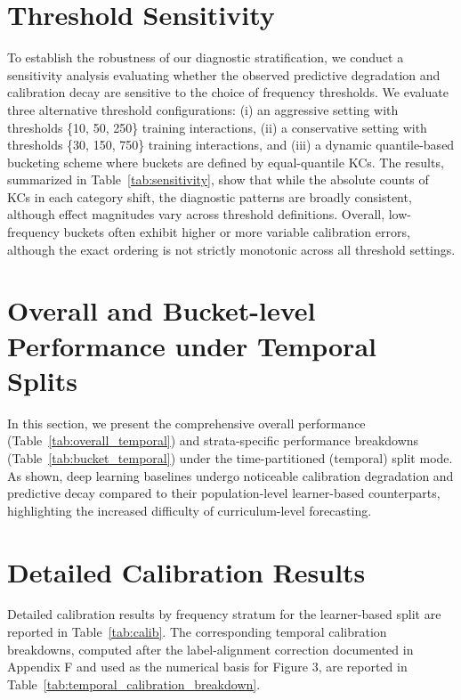 \section{Threshold Sensitivity}
\label{app:sensitivity}
To establish the robustness of our diagnostic stratification, we conduct a sensitivity analysis evaluating whether the observed predictive degradation and calibration decay are sensitive to the choice of frequency thresholds. We evaluate three alternative threshold configurations: (i) an aggressive setting with thresholds \{10, 50, 250\} training interactions, (ii) a conservative setting with thresholds \{30, 150, 750\} training interactions, and (iii) a dynamic quantile-based bucketing scheme where buckets are defined by equal-quantile KCs. The results, summarized in Table~\ref{tab:sensitivity}, show that while the absolute counts of KCs in each category shift, the diagnostic patterns are broadly consistent, although effect magnitudes vary across threshold definitions. Overall, low-frequency buckets often exhibit higher or more variable calibration errors, although the exact ordering is not strictly monotonic across all threshold settings.


\FloatBarrier

\section{Overall and Bucket-level Performance under Temporal Splits}
\label{app:temporal_performance}
In this section, we present the comprehensive overall performance (Table~\ref{tab:overall_temporal}) and strata-specific performance breakdowns (Table~\ref{tab:bucket_temporal}) under the time-partitioned (temporal) split mode. As shown, deep learning baselines undergo noticeable calibration degradation and predictive decay compared to their population-level learner-based counterparts, highlighting the increased difficulty of curriculum-level forecasting.




\clearpage
\onecolumn
\section{Detailed Calibration Results}
\label{app:calibration_performance}
Detailed calibration results by frequency stratum for the learner-based split are reported in Table~\ref{tab:calib}. The corresponding temporal calibration breakdowns, computed after the label-alignment correction documented in Appendix F and used as the numerical basis for Figure 3, are reported in Table~\ref{tab:temporal_calibration_breakdown}.

